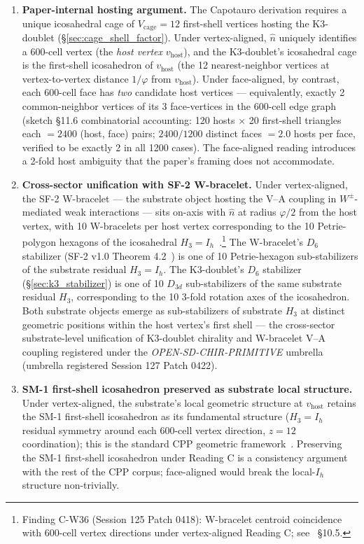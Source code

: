 \documentclass[11pt,letterpaper]{article}
\newcommand{\phig}{\varphi}
\newcommand{\Dsix}{D_6}
\begin{document}
\begin{enumerate}\setlength\itemsep{0.2em}
    \item \textbf{Paper-internal hosting argument.} The Capotauro derivation requires a unique icosahedral cage of $V_{\text{cage}} = 12$ first-shell vertices hosting the K3-doublet (\S\ref{sec:cage_shell_factor}). Under vertex-aligned, $\hat{n}$ uniquely identifies a 600-cell vertex (the \emph{host vertex} $v_{\text{host}}$), and the K3-doublet's icosahedral cage is the first-shell icosahedron of $v_{\text{host}}$ (the 12 nearest-neighbor vertices at vertex-to-vertex distance $1/\phig$ from $v_{\text{host}}$). Under face-aligned, by contrast, each 600-cell face has \emph{two} candidate host vertices --- equivalently, exactly 2 common-neighbor vertices of its 3 face-vertices in the 600-cell edge graph~\cite{abshier_capotauro_chiral_mechanism_sketch} (sketch \S11.6 combinatorial accounting: 120 hosts $\times$ 20 first-shell triangles each $= 2400$ (host, face) pairs; $2400 / 1200$ distinct faces $= 2.0$ hosts per face, verified to be exactly 2 in all 1200 cases). The face-aligned reading introduces a 2-fold host ambiguity that the paper's framing does not accommodate.
    \item \textbf{Cross-sector unification with SF-2 W-bracelet.} Under vertex-aligned, the SF-2 W-bracelet --- the substrate object hosting the V--A coupling in $W^\pm$-mediated weak interactions --- sits on-axis with $\hat{n}$ at radius $\phig/2$ from the host vertex, with 10 W-bracelets per host vertex corresponding to the 10 Petrie-polygon hexagons of the icosahedral $H_3 = I_h$~\cite{abshier_sf2}.\footnote{Finding C-W36 (Session 125 Patch 0418): W-bracelet centroid coincidence with 600-cell vertex directions under vertex-aligned Reading C; see~\cite{abshier_capotauro_chiral_mechanism_sketch} \S10.5.} The W-bracelet's $\Dsix$ stabilizer (SF-2 v1.0 Theorem 4.2~\cite{abshier_sf2}) is one of 10 Petrie-hexagon sub-stabilizers of the substrate residual $H_3 = I_h$. The K3-doublet's $\Dsix$ stabilizer (\S\ref{sec:k3_stabilizer}) is one of 10 $D_{3d}$ sub-stabilizers of the same substrate residual $H_3$, corresponding to the 10 3-fold rotation axes of the icosahedron. Both substrate objects emerge as sub-stabilizers of substrate $H_3$ at distinct geometric positions within the host vertex's first shell --- the cross-sector substrate-level unification of K3-doublet chirality and W-bracelet V--A coupling registered under the \emph{OPEN-SD-CHIR-PRIMITIVE} umbrella~\cite{abshier_research_frontier} (umbrella registered Session 127 Patch 0422).
    \item \textbf{SM-1 first-shell icosahedron preserved as substrate local structure.} Under vertex-aligned, the substrate's local geometric structure at $v_{\text{host}}$ retains the SM-1 first-shell icosahedron as its fundamental structure ($H_3 = I_h$ residual symmetry around each 600-cell vertex direction, $z = 12$ coordination); this is the standard CPP geometric framework~\cite{abshier_sm1}. Preserving the SM-1 first-shell icosahedron under Reading C is a consistency argument with the rest of the CPP corpus; face-aligned would break the local-$I_h$ structure non-trivially.
\end{enumerate}
\end{document}
